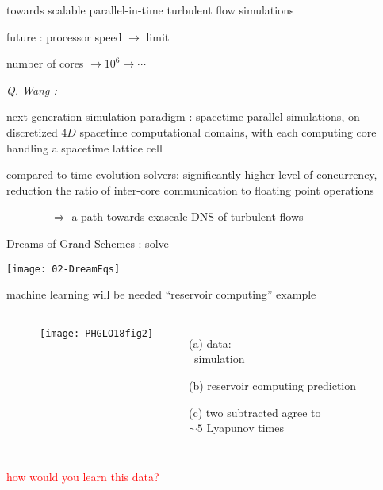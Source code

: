 \begin{frame}{
towards scalable parallel-in-time turbulent flow simulations
}
\begin{block}{future :}%
processor speed $\to$ limit

\medskip

number of cores $\to 10^6 \to \cdots$

\medskip
\end{block}

\emph{Q. Wang%
    :} %

next-generation simulation paradigm : spacetime parallel
simulations, on discretized $4D$ spacetime
computational domains, with each computing core handling a spacetime lattice cell

\bigskip

compared to time-evolution solvers:
significantly higher level of concurrency, reduction the ratio of
inter-core communication to floating point operations

\bigskip

$\qquad\qquad\Rightarrow$ a path towards exascale DNS of turbulent flows
\end{frame}

\begin{frame}{Dreams of Grand Schemes :  solve}
 \begin{center}
   \texttt{[image: 02-DreamEqs]}
 \end{center}
\end{frame}

\begin{frame}{machine learning will be needed}
``reservoir computing'' example

\bigskip

 \begin{columns}
~~~~~~\texttt{[image: PHGLO18fig2]}
 \begin{itemize}
 \item[(a)] data: \\ \KS\ simulation
 \item[(b)] reservoir computing prediction
 \item[(c)] two subtracted agree to \\
            $\sim 5$ Lyapunov times
 \end{itemize}
 \end{columns}
\vfill\hfill\textcolor{red}{\huge how would you learn this data?}
\end{frame}


